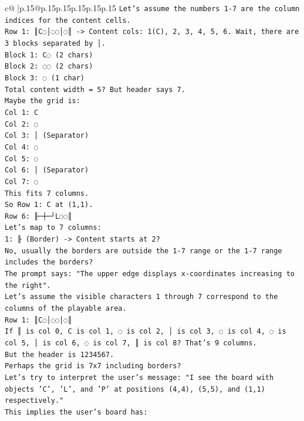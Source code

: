 \documentclass{article}
\begin{document}
{\begin{supertabular}{c@{$\;$}|p{.15\linewidth}@{}p{.15\linewidth}p{.15\linewidth}p{.15\linewidth}p{.15\linewidth}p{.15\linewidth}}
{{{\texttt{Let's assume the numbers 1{-}7 are the column indices for the content cells.} \\
\texttt{Row 1: ║C◌│◌◌│◌║ {-}> Content cols: 1(C), 2, 3, 4, 5, 6. Wait, there are 3 blocks separated by │.} \\
\texttt{Block 1: C◌ (2 chars)} \\
\texttt{Block 2: ◌◌ (2 chars)} \\
\texttt{Block 3: ◌ (1 char)} \\
\texttt{Total content width = 5? But header says 7.} \\
\texttt{Maybe the grid is:} \\
\texttt{Col 1: C} \\
\texttt{Col 2: ◌} \\
\texttt{Col 3: │ (Separator)} \\
\texttt{Col 4: ◌} \\
\texttt{Col 5: ◌} \\
\texttt{Col 6: │ (Separator)} \\
\texttt{Col 7: ◌} \\
\texttt{This fits 7 columns.} \\
\texttt{So Row 1: C at (1,1).} \\
\texttt{Row 6: ╟─┼─┘L◌◌║} \\
\texttt{Let's map to 7 columns:} \\
\texttt{1: ╟ (Border) {-}> Content starts at 2?} \\
\texttt{No, usually the borders are outside the 1{-}7 range or the 1{-}7 range includes the borders?} \\
\texttt{The prompt says: "The upper edge displays x{-}coordinates increasing to the right".} \\
\texttt{Let's assume the visible characters 1 through 7 correspond to the columns of the playable area.} \\
\texttt{Row 1: ║C◌│◌◌│◌║} \\
\texttt{If ║ is col 0, C is col 1, ◌ is col 2, │ is col 3, ◌ is col 4, ◌ is col 5, │ is col 6, ◌ is col 7, ║ is col 8? That's 9 columns.} \\
\texttt{But the header is 1234567.} \\
\texttt{Perhaps the grid is 7x7 including borders?} \\
\texttt{Let's try to interpret the user's message: "I see the board with objects 'C', 'L', and 'P' at positions (4,4), (5,5), and (1,1) respectively."} \\
\texttt{This implies the user's board has:} \\
}}}
\end{supertabular}}
\end{document}
